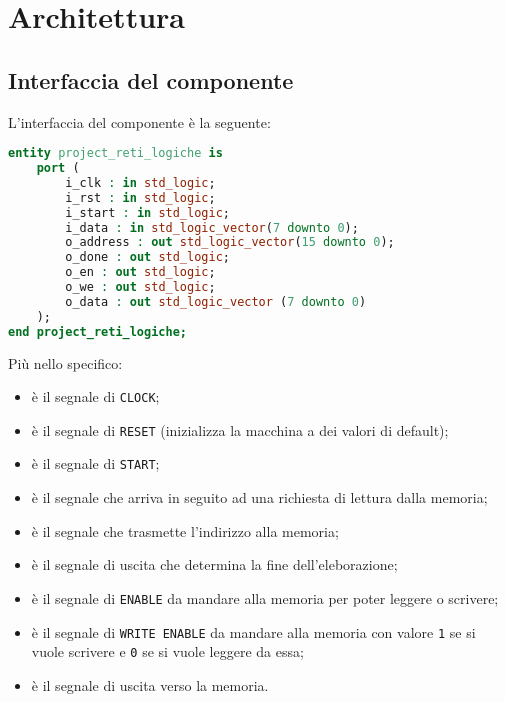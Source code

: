 \documentclass{article}
\begin{document}
\newpage
\section{Architettura}
\subsection{Interfaccia del componente}
L'interfaccia del componente è la seguente:
\begin{lstlisting}[language=VHDL]
entity project_reti_logiche is
    port (
        i_clk : in std_logic;
        i_rst : in std_logic;
        i_start : in std_logic;
        i_data : in std_logic_vector(7 downto 0);
        o_address : out std_logic_vector(15 downto 0);
        o_done : out std_logic;
        o_en : out std_logic;
        o_we : out std_logic;
        o_data : out std_logic_vector (7 downto 0)
    );
end project_reti_logiche;
\end{lstlisting}
\vspace{0.3cm}
Più nello specifico:
\begin{itemize}
  \item[\verb^i\_clk^] è il segnale di \verb^CLOCK^;
  \item[\verb^i\_rst^] è il segnale di \verb^RESET^ (inizializza la macchina a dei valori di default);
  \item[\verb^i\_start^] è il segnale di \verb^START^;
  \item[\verb^i\_data^] è il segnale che arriva in seguito ad una richiesta di lettura dalla memoria;
  \item[\verb^o\_address^] è il segnale che trasmette l'indirizzo alla memoria;
  \item[\verb^o\_done^] è il segnale di uscita che determina la fine dell'eleborazione;
  \item[\verb^o\_en^] è il segnale di \verb^ENABLE^ da mandare alla memoria per poter leggere o scrivere;
  \item[\verb^o\_we^] è il segnale di \verb^WRITE ENABLE^ da mandare alla memoria con valore \verb^1^ se si vuole scrivere e \verb^0^ se si vuole leggere da essa;
  \item[\verb^o\_data^] è il segnale di uscita verso la memoria.
\end{itemize}
\end{document}
